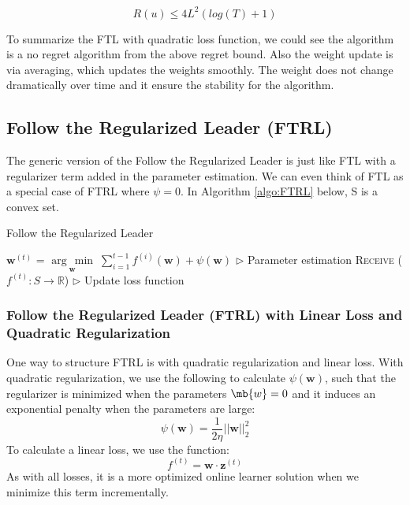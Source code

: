 \documentclass[11pt]{article}
\newcommand{\argmin}[1]{\underset{#1}{\operatorname{arg}\,\operatorname{min}}\;}
\begin{document}
\begin{equation*}
    R(u) \leq 4L^2(log(T) + 1)
\end{equation*}

To summarize the FTL with quadratic loss function, we could see the algorithm is a no regret algorithm from the above regret bound. Also the weight update is via averaging, which updates the weights smoothly. The weight does not change dramatically over time and it ensure the stability for the algorithm.


\subsection{Follow the Regularized Leader (FTRL)}
The generic  version of the Follow the Regularized Leader is just like FTL with a regularizer term added in the parameter estimation. We can even think of FTL as a special case of FTRL where $\psi = 0$. In Algorithm \ref{algo:FTRL} below, S is a convex set.

\begin{algorithm}[H]
\caption{Follow the Regularized Leader}
\label{algo:FTRL}
\begin{algorithmic}[1]
    \STATE $\bm{w}^{(t)}$ = $\argmin{\bm{w}} \sum^{t-1}_{i=1} f^{(i)} (\bm{w}) + \psi (\bm{w})$ \hfill $\triangleright$ Parameter estimation
    \STATE \textsc{Receive} ($f^{(t)} : S \rightarrow \mathbb{R}$) \hfill $\triangleright$ Update loss function
\ENDFOR

\end{algorithmic}
\end{algorithm}


\subsubsection{Follow the Regularized Leader (FTRL) with Linear Loss and Quadratic Regularization}

One way to structure FTRL is with quadratic regularization and linear loss. With quadratic regularization, we use the following to calculate $\psi(\bm{w})$, such that the regularizer is minimized when the parameters $\mb{w} = 0$ and it induces an exponential penalty when the parameters are large:
\[
\psi(\bm{w}) = \frac{1}{2\eta}||\bm{w}||^2_2
\]
To calculate a linear loss, we use the function:
\[
f^{(t)} = \bm{w}\cdot\bm{z}^{(t)}
\]
As with all losses, it is a more optimized online learner solution when we minimize this term incrementally.
\end{document}
